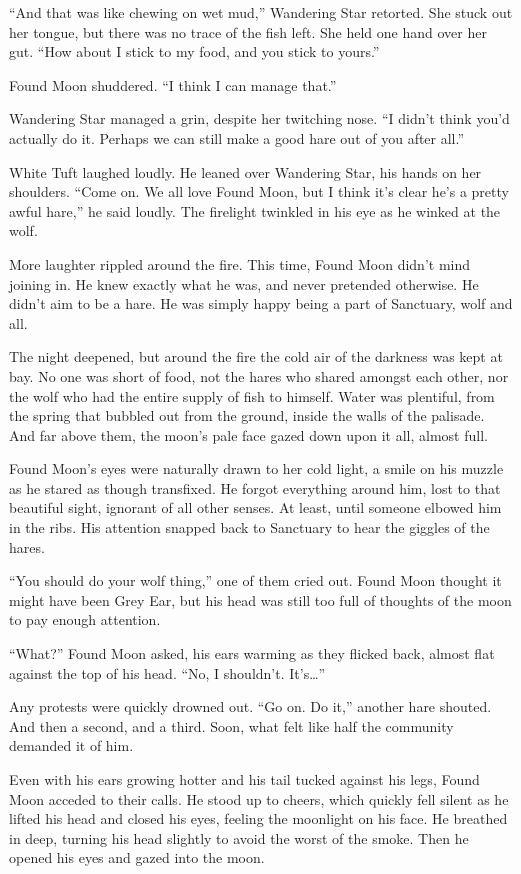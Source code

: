``And that was like chewing on wet mud,'' Wandering Star retorted. She stuck out her tongue, but there was no trace of the fish left. She held one hand over her gut. ``How about I stick to my food, and you stick to yours.''

Found Moon shuddered. ``I think I can manage that.''

Wandering Star managed a grin, despite her twitching nose. ``I didn't think you'd actually do it. Perhaps we can still make a good hare out of you after all.''

White Tuft laughed loudly. He leaned over Wandering Star, his hands on her shoulders. ``Come on. We all love Found Moon, but I think it's clear he's a pretty awful hare,'' he said loudly. The firelight twinkled in his eye as he winked at the wolf.

More laughter rippled around the fire. This time, Found Moon didn't mind joining in. He knew exactly what he was, and never pretended otherwise. He didn't aim to be a hare. He was simply happy being a part of Sanctuary, wolf and all.

The night deepened, but around the fire the cold air of the darkness was kept at bay. No one was short of food, not the hares who shared amongst each other, nor the wolf who had the entire supply of fish to himself. Water was plentiful, from the spring that bubbled out from the ground, inside the walls of the palisade. And far above them, the moon's pale face gazed down upon it all, almost full.

Found Moon's eyes were naturally drawn to her cold light, a smile on his muzzle as he stared as though transfixed. He forgot everything around him, lost to that beautiful sight, ignorant of all other senses. At least, until someone elbowed him in the ribs. His attention snapped back to Sanctuary to hear the giggles of the hares.

``You should do your wolf thing,'' one of them cried out. Found Moon thought it might have been Grey Ear, but his head was still too full of thoughts of the moon to pay enough attention.

``What?'' Found Moon asked, his ears warming as they flicked back, almost flat against the top of his head. ``No, I shouldn't. It's\ldots''

Any protests were quickly drowned out. ``Go on. Do it,'' another hare shouted. And then a second, and a third. Soon, what felt like half the community demanded it of him.

Even with his ears growing hotter and his tail tucked against his legs, Found Moon acceded to their calls. He stood up to cheers, which quickly fell silent as he lifted his head and closed his eyes, feeling the moonlight on his face. He breathed in deep, turning his head slightly to avoid the worst of the smoke. Then he opened his eyes and gazed into the moon.


